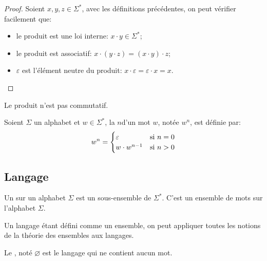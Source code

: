 \begin{proof}
	Soient \( x, y, z \in \Sigma^* \), avec les définitions précédentes, on peut vérifier facilement que:
	\begin{itemize}
		\item
		      le produit est une loi interne: \( x \cdot y \in \Sigma^*\);
		\item
		      le produit est associatif: \( x \cdot (y \cdot z) = (x \cdot y) \cdot z\);
		\item
		      \( \varepsilon\) est l'élément neutre du produit: \( x \cdot \varepsilon = \varepsilon \cdot x = x\).
	\end{itemize}
\end{proof}

Le produit n'est pas commutatif.

\begin{definition}
	Soient \( \Sigma \) un alphabet et \( w \in \Sigma^* \), la  \( n \)\ieme d'un mot \( w \), notée \( w^n \), est définie par:
	\[
		w^n =
		\begin{cases}
			\varepsilon     & \text{si \( n = 0\)} \\
			w \cdot w^{n-1} & \text{si \( n > 0\)}
		\end{cases}
	\]
\end{definition}


\subsection{Langage}

\begin{definition}
	Un  sur un alphabet \( \Sigma \) est un sous-ensemble de \( \Sigma^* \). C'est un ensemble de mots sur l'alphabet \( \Sigma \).
\end{definition}

Un langage étant défini comme un ensemble, on peut appliquer toutes les notions de la théorie des ensembles aux langages.

\begin{definition}
	Le , noté \( \varnothing \) est le langage qui ne contient aucun mot.
\end{definition}

